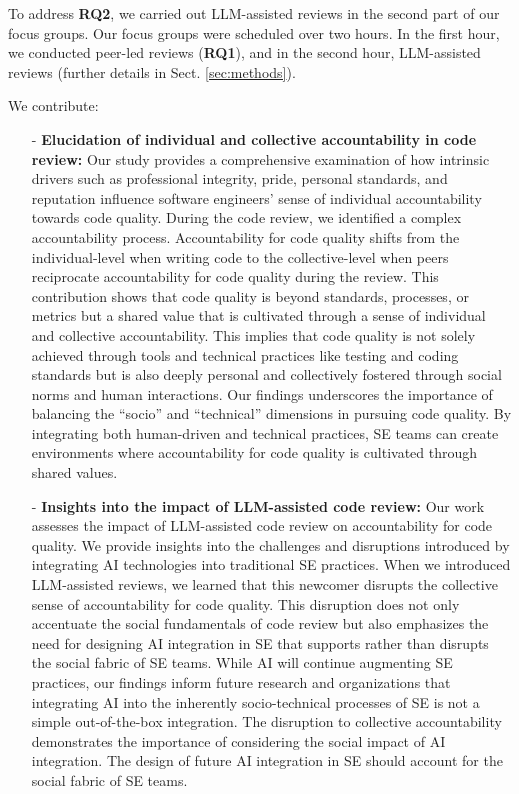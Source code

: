 To address \textbf{RQ2}, we carried out LLM-assisted reviews in the second part of our focus groups. Our focus groups were scheduled over two hours. In the first hour, we conducted peer-led reviews (\textbf{RQ1}), and in the second hour, LLM-assisted reviews (further details in Sect. \ref{sec:methods}). 

We contribute:

\begin{itemize}

    \item [-] \textbf{Elucidation of individual and collective accountability in code review:} Our study provides a comprehensive examination of how intrinsic drivers such as professional integrity, pride, personal standards, and reputation influence software engineers' sense of individual accountability towards code quality. During the code review, we identified a complex accountability process. Accountability for code quality shifts from the individual-level when writing code to the collective-level when peers reciprocate accountability for code quality during the review. This contribution shows that code quality is beyond standards, processes, or metrics but a shared value that is cultivated through a sense of individual and collective accountability. This implies that code quality is not solely achieved through tools and technical practices like testing and coding standards but is also deeply personal and collectively fostered through social norms and human interactions. Our findings underscores the importance of balancing the ``socio'' and ``technical'' dimensions in pursuing code quality. By integrating both human-driven and technical practices, SE teams can create environments where accountability for code quality is cultivated through shared values.

    \item [-] \textbf{Insights into the impact of LLM-assisted code review:} Our work assesses the impact of LLM-assisted code review on accountability for code quality. We provide insights into the challenges and disruptions introduced by integrating AI technologies into traditional SE practices. When we introduced LLM-assisted reviews, we learned that this newcomer disrupts the collective sense of accountability for code quality. This disruption does not only accentuate the social fundamentals of code review but also emphasizes the need for designing AI integration in SE that supports rather than disrupts the social fabric of SE teams. While AI will continue augmenting SE practices, our findings inform future research and organizations that integrating AI into the inherently socio-technical processes of SE is not a simple out-of-the-box integration. The disruption to collective accountability demonstrates the importance of considering the social impact of AI integration. The design of future AI integration in SE should account for the social fabric of SE teams.


\end{itemize}
